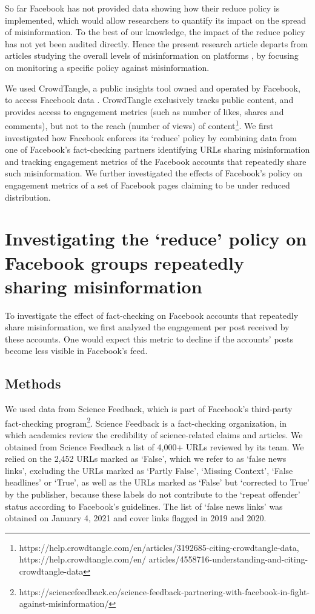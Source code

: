\documentclass[11pt,a4paper]{article}
\begin{document}
So far Facebook has not provided data showing how their reduce policy is implemented, which would allow researchers to quantify its impact on the spread of misinformation. 
To the best of our knowledge, the impact of the reduce policy has not yet been audited directly.
Hence the present research article departs from articles studying the overall levels of misinformation on platforms \citep{allcott2019trends, kornbluh2020new, resnick2018iffy}, by focusing on monitoring a specific policy against misinformation.

We used CrowdTangle, a public insights tool owned and operated by Facebook, to access Facebook data \citep{team2020crowdtangle}. 
CrowdTangle exclusively tracks public content, and provides access to engagement metrics (such as number of likes, shares and comments), but not to the reach (number of views) of content\footnote{https://help.crowdtangle.com/en/articles/3192685-citing-crowdtangle-data, https://help.crowdtangle.com/en/
articles/4558716-understanding-and-citing-crowdtangle-data}. 
We first investigated how Facebook enforces its ‘reduce’ policy by combining data from one of Facebook's fact-checking partners identifying URLs sharing misinformation and tracking engagement metrics of the Facebook accounts that repeatedly share such misinformation. 
We further investigated the effects of Facebook’s policy on engagement metrics of a set of Facebook pages claiming to be under reduced distribution.

\section{Investigating the `reduce’ policy on Facebook groups repeatedly sharing misinformation}

To investigate the effect of fact-checking on Facebook accounts that repeatedly share misinformation, we first analyzed the engagement per post received by these accounts. One would expect this metric to decline if the accounts’ posts become less visible in Facebook’s feed.

\subsection{Methods}

We used data from Science Feedback, which is part of Facebook’s third-party fact-checking program\footnote{https://sciencefeedback.co/science-feedback-partnering-with-facebook-in-fight-against-misinformation/}. Science Feedback is a fact-checking organization, in which academics review the credibility of science-related claims and articles. 
We obtained from Science Feedback a list of 4,000+ URLs reviewed by its team. 
We relied on the 2,452 URLs marked as `False', which we refer to as `false news links', excluding the URLs marked as `Partly False', `Missing Context', `False headlines' or `True', as well as the URLs marked as `False' but `corrected to True' by the publisher, because these labels do not contribute to the `repeat offender' status according to Facebook's guidelines. 
The list of `false news links' was obtained on January 4, 2021 and cover links flagged in 2019 and 2020.
\end{document}

